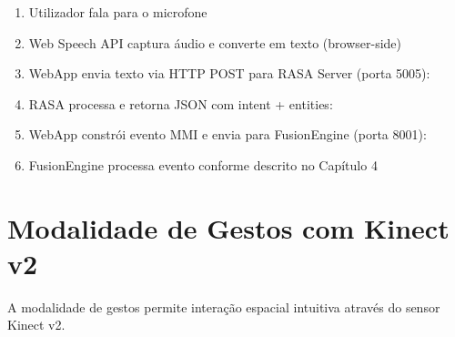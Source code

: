\documentclass{report}
\begin{document}
\begin{enumerate}
    \item Utilizador fala para o microfone
    \item Web Speech API captura áudio e converte em texto (browser-side)
    \item WebApp envia texto via HTTP POST para RASA Server (porta 5005):

    \item RASA processa e retorna JSON com intent + entities:

    \item WebApp constrói evento MMI e envia para FusionEngine (porta 8001):

    \item FusionEngine processa evento conforme descrito no Capítulo 4
\end{enumerate}

\section{Modalidade de Gestos com Kinect v2}

A modalidade de gestos permite interação espacial intuitiva através do sensor Kinect v2.
\end{document}
